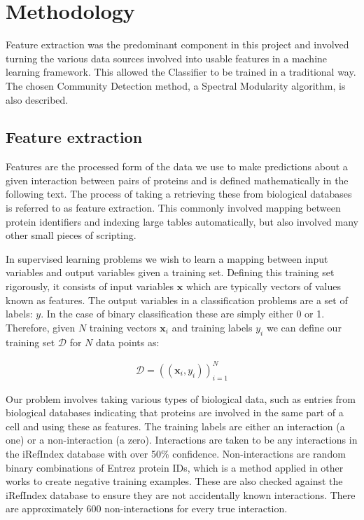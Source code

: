 \chapter{Methodology}
\label{methods}

Feature extraction was the predominant component in this project and involved turning the various data sources involved into usable features in a machine learning framework.
This allowed the Classifier to be trained in a traditional way.
The chosen Community Detection method, a Spectral Modularity algorithm, is also described.

\section{Feature extraction}

Features are the processed form of the data we use to make predictions about a given interaction between pairs of proteins and is defined mathematically in the following text.
The process of taking a retrieving these from biological databases is referred to as feature extraction.
This commonly involved mapping between protein identifiers and indexing large tables automatically, but also involved many other small pieces of scripting.

In supervised learning problems we wish to learn a mapping between input variables and output variables given a training set.
Defining this training set rigorously, it consists of input variables $\pmb{x}$ which are typically vectors of values known as features.
The output variables in a classification problems are a set of labels\autocite[2]{murphy_machine_2012}: $y$.
In the case of binary classification these are simply either 0 or 1.
Therefore, given $N$ training vectors $\pmb{x}_{i}$ and training labels $y_{i}$ we can define our training set $\mathcal{D}$ for $N$ data points as:

\begin{align}
    \mathcal{D} = \left( ( \pmb{x}_{i}, y_{i} ) \right)_{i=1}^{N}
\end{align}


Our problem involves taking various types of biological data, such as entries from biological databases indicating that proteins are involved in the same part of a cell and using these as features.
The training labels are either an interaction (a one) or a non-interaction (a zero).
Interactions are taken to be any interactions in the iRefIndex\autocite{razick_irefindex_2008} database with over 50\% confidence.
Non-interactions are random binary combinations of Entrez protein IDs, which is a method applied in other works\autocite{qi_evaluation_2006} to create negative training examples.
These are also checked against the iRefIndex database to ensure they are not accidentally known interactions.
There are approximately 600 non-interactions for every true interaction.


